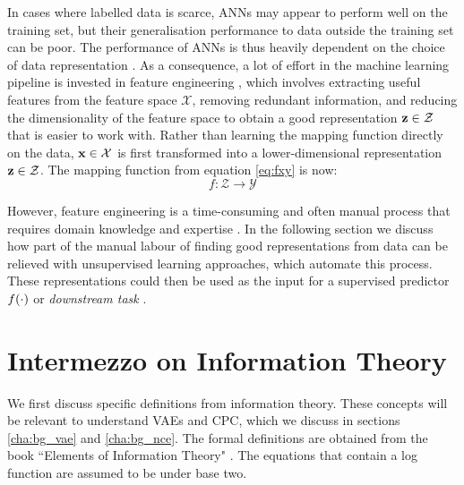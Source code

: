 		In cases where labelled data is scarce, ANNs may appear to perform well on the training set, but their generalisation performance to data outside the training set can be poor. The performance of ANNs is thus heavily dependent on the choice of data representation \citep{bengioRepresentationLearningReview2013a}. As a consequence, a lot of effort in the machine learning pipeline is invested in feature engineering \citep{zhengFeatureEngineeringMachine2018}, which involves extracting useful features from the feature space $\mathcal{X}$, removing redundant information, and reducing the dimensionality of the feature space \citep{valiDeepLearningLand2020} to obtain a good representation $\mathbf{z} \in \mathcal{Z}$ that is easier to work with. Rather than learning the mapping function directly on the data, $\mathbf{x} \in \mathcal{X}$ is first transformed into a lower-dimensional representation $\mathbf{z} \in \mathcal{Z}$. The mapping function from equation \ref{eq:fxy} is now:
		$$f: \mathcal{Z} \rightarrow \mathcal{Y} \label{eq:fxz} $$
		
		However, feature engineering is a time-consuming and often manual process that requires domain knowledge and expertise \citep{przybyszewskiUseDomainKnowledge2017, weiIntegrationDomainKnowledgeGuided2021}. In the following section we discuss how part of the manual labour of finding good representations from data can be relieved with unsupervised learning approaches, which automate this process. These representations could then be used as the input for a supervised predictor $f(\cdot)$ or \textit{downstream task} \citep{zhangOmiEmbedUnifiedMultiTask2021}.
		
		
		
		
		
		
		
\section{Intermezzo on Information Theory}
	We first discuss specific definitions from information theory. These concepts will be relevant to understand VAEs and CPC, which we discuss in sections \ref{cha:bg_vae} and \ref{cha:bg_nce}. The formal definitions are obtained from the book ``Elements of Information Theory" \citep{coverElementsInformationTheory2006}. The equations that contain a log function are assumed to be under base two.
	

